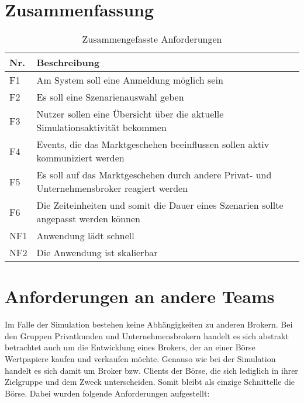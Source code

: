 \section{Zusammenfassung}
	\begin{table}[ht!]
		\centering
		\begin{tabularx}{.8\textwidth}{l|X}
			Nr.     & Beschreibung                              \\\hline
			F1      & Am System soll eine Anmeldung möglich sein                  \\
			F2		& Es soll eine Szenarienauswahl geben \\
			F3      & Nutzer sollen eine Übersicht über die aktuelle Simulationsaktivität bekommen  \\
			F4      & Events, die das Marktgeschehen beeinflussen sollen aktiv kommuniziert werden  \\
			F5      & Es soll auf das Marktgeschehen durch andere Privat- und Unternehmensbroker reagiert werden  \\
			F6      & Die Zeiteinheiten und somit die Dauer eines Szenarien sollte angepasst werden können  \\\hline
			NF1     & Anwendung lädt schnell                    \\
			NF2     & Die Anwendung ist skalierbar                \\
		\end{tabularx}
		\caption{Zusammengefasste Anforderungen}
		\label{tab:anforderungen}
	\end{table}


	
\section{Anforderungen an andere Teams}\label{sec:otherTeams}
	Im Falle der Simulation bestehen keine Abhängigkeiten zu anderen Brokern. Bei den Gruppen Privatkunden und Unternehmensbrokern handelt es sich abstrakt betrachtet auch um die Entwicklung eines Brokers, der an einer Börse Wertpapiere kaufen und verkaufen möchte. Genauso wie bei der Simulation handelt es sich damit um Broker bzw. Clients der Börse, die sich lediglich in ihrer Zielgruppe und dem Zweck unterscheiden. Somit bleibt als einzige Schnittelle die Börse. Dabei wurden folgende Anforderungen aufgestellt:
	
